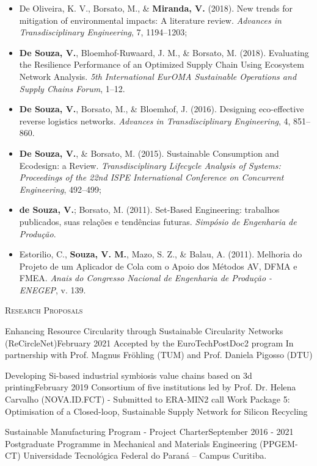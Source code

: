     \begin{itemize}
        \item De Oliveira, K. V., Borsato, M., \& \textbf{Miranda, V.} (2018). New trends for mitigation of environmental impacts: A literature review. \textit{Advances in Transdisciplinary Engineering}, 7, 1194–1203;
        \item \textbf{De Souza, V.}, Bloemhof-Ruwaard, J. M., \& Borsato, M. (2018). Evaluating the Resilience Performance of an Optimized Supply Chain Using Ecosystem Network Analysis. \textit{5th International EurOMA Sustainable Operations and Supply Chains Forum}, 1–12.
        \item \textbf{De Souza, V.}, Borsato, M., \& Bloemhof, J. (2016). Designing eco-effective reverse logistics networks. \textit{Advances in Transdisciplinary Engineering}, 4, 851–860.
        \item \textbf{De Souza, V.}, \& Borsato, M. (2015). Sustainable Consumption and Ecodesign: a Review. \textit{Transdisciplinary Lifecycle Analysis of Systems: Proceedings of the 22nd ISPE International Conference on Concurrent Engineering}, 492–499;
        \item \textbf{de Souza, V.}; Borsato, M. (2011). Set-Based Engineering: trabalhos publicados, suas relações e tendências futuras. \textit{Simpósio de Engenharia de Produção}.
        \item Estorilio, C., \textbf{Souza, V. M.}, Mazo, S. Z., \& Balau, A. (2011). Melhoria do Projeto de um Aplicador de Cola com o Apoio dos Métodos AV, DFMA e FMEA. \textit{Anais do Congresso Nacional de Engenharia de Produção - ENEGEP}, v. 139. 
    \end{itemize}

\textsc{Research Proposals}

\begin{projects}
    \project
	    {Enhancing Resource Circularity through Sustainable Circularity Networks (ReCircleNet)}{February 2021}
	    {Accepted by the EuroTechPostDoc2 program} 
	    {In partnership with Prof. Magnus Fröhling (TUM) and Prof. Daniela Pigosso (DTU)} 
\end{projects}  
\vspace{-30pt} 
\begin{projects}
    \project
	    {Developing Si-based industrial symbiosis value chains based on 3d printing}{February 2019}
	    {Consortium of five institutions led by Prof. Dr. Helena Carvalho (NOVA.ID.FCT) - Submitted to ERA-MIN2 call}
	    {Work Package 5: Optimisation of a Closed-loop, Sustainable Supply Network for Silicon Recycling}
\end{projects}    
\vspace{-30pt} 
\begin{projects}
    \project
	    {Sustainable Manufacturing Program - Project Charter}{September 2016 - 2021}
	    {Postgraduate Programme in Mechanical and Materials Engineering (PPGEM-CT)}
	    {Universidade Tecnológica Federal do Paraná – Campus Curitiba.}
\end{projects}    
\vspace{-25pt}    

